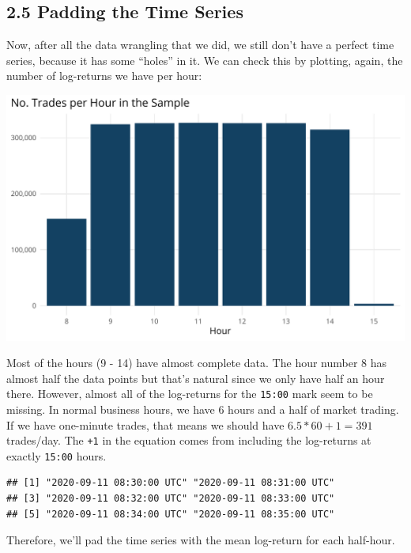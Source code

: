 \documentclass[]{elsarticle} %
\makeatletter
\def\maxwidth{\ifdim\Gin@nat@width>\linewidth\linewidth
\else\Gin@nat@width\fi}
\let\Oldincludegraphics\includegraphics
\renewcommand{\includegraphics}[1]{\Oldincludegraphics[width=\maxwidth]{#1}}
\makeatother
\begin{document}
\hypertarget{padding-the-time-series}{%
\subsection{2.5 Padding the Time Series}\label{padding-the-time-series}}

Now, after all the data wrangling that we did, we still don't have a
perfect time series, because it has some ``holes'' in it. We can check
this by plotting, again, the number of log-returns we have per hour:

\includegraphics{01-Data-Prep-Elsevier_files/figure-latex/unnamed-chunk-27-1.pdf}

Most of the hours (9 - 14) have almost complete data. The hour number 8
has almost half the data points but that's natural since we only have
half an hour there. However, almost all of the log-returns for the
\texttt{15:00} mark seem to be missing. In normal business hours, we
have 6 hours and a half of market trading. If we have one-minute trades,
that means we should have \(6.5 * 60 + 1 = 391\) trades/day. The
\texttt{+1} in the equation comes from including the log-returns at
exactly \texttt{15:00} hours.

\begin{verbatim}
## [1] "2020-09-11 08:30:00 UTC" "2020-09-11 08:31:00 UTC"
## [3] "2020-09-11 08:32:00 UTC" "2020-09-11 08:33:00 UTC"
## [5] "2020-09-11 08:34:00 UTC" "2020-09-11 08:35:00 UTC"
\end{verbatim}

Therefore, we'll pad the time series with the mean log-return for each
half-hour.
\end{document}
